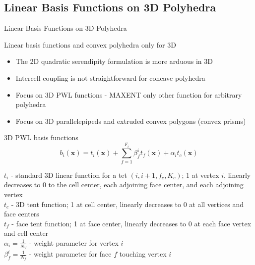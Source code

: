\documentclass[compress,10pt]{beamer}
\renewcommand{\vec}[1]{\mathbf{#1}}
\begin{document}
\subsection{Linear Basis Functions on 3D Polyhedra}
\typeout{***********************************************************************************}
\begin{frame}[t]{Linear Basis Functions on 3D Polyhedra}
\begin{block}{Linear basis functions and convex polyhedra only for 3D}{\small
\begin{itemize}
\item The 2D quadratic serendipity formulation is more arduous in 3D
\item Intercell coupling is not straightforward for concave polyhedra
\item Focus on 3D PWL functions - MAXENT only other function for arbitrary polyhedra
\item Focus on 3D parallelepipeds and extruded convex polygons (convex prisms)
\end{itemize}}
\end{block}
\begin{block}{3D PWL basis functions}{\small
\begin{equation*}
b_i (\vec{x})  = t_i  (\vec{x})  + \sum_{f=1}^{F_i} \beta_f^i  t_f (\vec{x}) + \alpha_i t_c  (\vec{x}) 
\end{equation*}
}\end{block}
\begin{block}{}{\footnotesize
$t_i$ - standard 3D linear function for a tet $(i,i+1,f_c,K_c)$; 1 at vertex $i$, linearly decreases to 0 to the cell center, each adjoining face center, and each adjoining vertex\\ \vspace{0.5mm}
$t_c$ - 3D tent function; 1 at cell center, linearly decreases to 0 at all vertices and face centers \\ \vspace{0.5mm}
$t_f$ - face tent function; 1 at face center, linearly decreases to 0 at each face vertex and cell center\\ \vspace{0.5mm}
$\alpha_i = \frac{1}{N_V}$ - weight parameter for vertex $i$\\ \vspace{0.5mm}
$\beta_f^i = \frac{1}{N_f}$ - weight parameter for face $f$ touching vertex $i$
}\end{block}
\end{frame}
%
%
\end{document}
